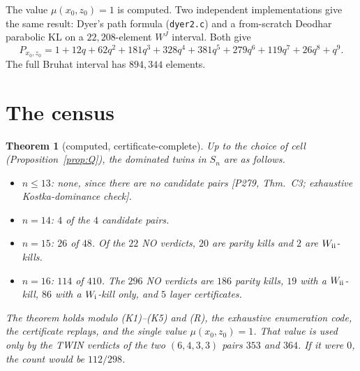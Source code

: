 \documentclass[11pt]{amsart}
\newcommand{\gr}[1]{\textsf{#1}}
\theoremstyle{plain}
\newtheorem{theorem}{Theorem}
\theoremstyle{definition}
\begin{document}
The value $\mu(x_0,z_0)=1$ is \gr{computed}. Two independent implementations give the same result: Dyer's path formula (\texttt{dyer2.c}) and a from-scratch Deodhar parabolic KL on a $22{,}208$-element $W^J$ interval. Both give
\[P_{x_0,z_0}=1+12q+62q^2+181q^3+328q^4+381q^5+279q^6+119q^7+26q^8+q^9.\]
The full Bruhat interval has $894{,}344$ elements.

\section{The census}

\begin{theorem}[computed, certificate-complete]\label{thm:census}
Up to the choice of cell (Proposition~\ref{prop:Q}), the dominated twins in $S_n$ are as follows.
\begin{itemize}[leftmargin=*,itemsep=0pt]
\item $n\le13$: none, since there are no candidate pairs [P279, Thm.~C3; exhaustive Kostka-dominance check].
\item $n=14$: $4$ of the $4$ candidate pairs.
\item $n=15$: $26$ of $48$. Of the $22$ NO verdicts, $20$ are parity kills and $2$ are $W_{\rm ii}$-kills.
\item $n=16$: $114$ of $410$. The $296$ NO verdicts are $186$ parity kills, $19$ with a $W_{\rm ii}$-kill, $86$ with a $W_{\rm i}$-kill only, and $5$ layer certificates.
\end{itemize}
The theorem holds modulo (K1)--(K5) and (R), the exhaustive enumeration code, the certificate replays, and the single value $\mu(x_0,z_0)=1$. That value is used only by the TWIN verdicts of the two $(6,4,3,3)$ pairs $353$ and $364$. If it were $0$, the count would be $112/298$.
\end{theorem}
\end{document}
